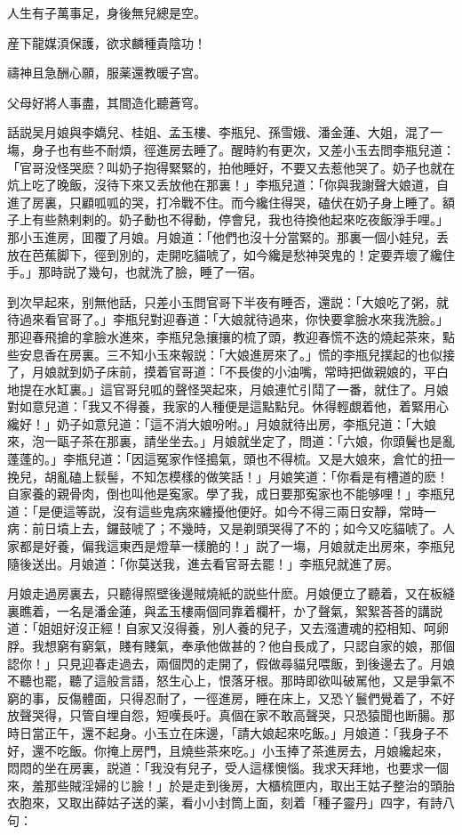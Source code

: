 人生有子萬事足，身後無兒總是空。

産下龍媒湏保護，欲求麟種貴陰功！

禱神且急酬心願，服薬還教暖子宫。

父母好將人事盡，其間造化聽蒼穹。

話説吴月娘與李嬌兒、桂姐、孟玉樓、李瓶兒、孫雪娥、潘金蓮、大姐，混了一塲，身子也有些不耐煩，徑進房去睡了。醒時約有更次，又差小玉去問李瓶兒道：「官哥没怪哭麽？叫奶子抱得緊緊的，拍他睡好，不要又去惹他哭了。奶子也就在炕上吃了晚飯，沒待下來又丢放他在那裏！」李瓶兒道：「你與我謝聲大娘道，自進了房裏，只顧呱呱的哭，打冷戰不住。而今纔住得哭，磕伏在奶子身上睡了。額子上有些熱剌剌的。奶子動也不得動，停會兒，我也待換他起來吃夜飯淨手哩。」那小玉進房，囬覆了月娘。月娘道：「他們也沒十分當緊的。那裏一個小娃兒，丢放在芭蕉脚下，徑到別的，走開吃貓唬了，如今纔是愁神哭鬼的！定要弄壞了纔住手。」那時説了幾句，也就洗了臉，睡了一宿。

到次早起來，别無他話，只差小玉問官哥下半夜有睡否，還説：「大娘吃了粥，就待過來看官哥了。」李瓶兒對迎春道：「大娘就待過來，你快要拿臉水來我洗臉。」那迎春飛搶的拿臉水進來，李瓶兒急攘攘的梳了頭，教迎春慌不迭的燒起茶來，點些安息香在房裏。三不知小玉來報説：「大娘進房來了。」慌的李瓶兒撲起的也似接了，月娘就到奶子床前，摸着官哥道：「不長俊的小油嘴，常時把做親娘的，平白地提在水缸裏。」這官哥兒呱的聲怪哭起來，月娘連忙引鬦了一番，就住了。月娘對如意兒道：「我又不得養，我家的人種便是這點點兒。休得輕覷着他，着緊用心纔好！」奶子如意兒道：「這不消大娘吩咐。」月娘就待出房，李瓶兒道：「大娘來，泡一甌子茶在那裏，請坐坐去。」月娘就坐定了，問道：「六娘，你頭鬢也是亂蓬蓬的。」李瓶兒道：「因這冤家作怪搗氣，頭也不得梳。又是大娘來，倉忙的扭一挽兒，胡亂磕上䯼髻，不知怎模樣的做笑話！」月娘笑道：「你看是有槽道的麽！自家養的親骨肉，倒也叫他是寃家。學了我，成日要那寃家也不能够哩！」李瓶兒道：「是便這等説，沒有這些鬼病來纏擾他便好。如今不得三兩日安靜，常時一病：前日墳上去，鑼鼓唬了；不幾時，又是剃頭哭得了不的；如今又吃貓唬了。人家都是好養，偏我這東西是燈草一樣脆的！」説了一塲，月娘就走出房來，李瓶兒隨後送出。月娘道：「你莫送我，進去看官哥去罷！」李瓶兒就進了房。

月娘走過房裏去，只聽得照壁後邊賊燒紙的説些什麽。月娘便立了聽着，又在板縫裏瞧着，一名是潘金蓮，與孟玉樓兩個同靠着欄杆，か了聲氣，絮絮荅荅的講説道：「姐姐好沒正經！自家又沒得養，別人養的兒子，又去漒遭魂的掗相知、呵卵脬。我想窮有窮氣，賤有賤氣，奉承他做甚的？他自長成了，只認自家的娘，那個認你！」只見迎春走過去，兩個閃的走開了，假做尋貓兒喂飯，到後邊去了。月娘不聽也罷，聽了這般言語，怒生心上，恨落牙根。那時即欲叫破駡他，又是爭氣不窮的事，反傷體面，只得忍耐了，一徑進房，睡在床上，又恐丫鬟們覺着了，不好放聲哭得，只管自埋自怨，短嘆長吁。真個在家不敢高聲哭，只恐猿聞也断腸。那時日當正午，還不起身。小玉立在床邊，「請大娘起來吃飯。」月娘道：「我身子不好，還不吃飯。你掩上房門，且燒些茶來吃。」小玉捧了茶進房去，月娘纔起來，悶悶的坐在房裏，説道：「我没有兒子，受人這樣懊惱。我求天拜地，也要求一個來，羞那些賊淫婦的じ臉！」於是走到後房，大櫃梳匣内，取出王姑子整治的頭胎衣胞來，又取出薛姑子送的薬，看小小封筒上面，刻着「種子靈丹」四字，有詩八句：

